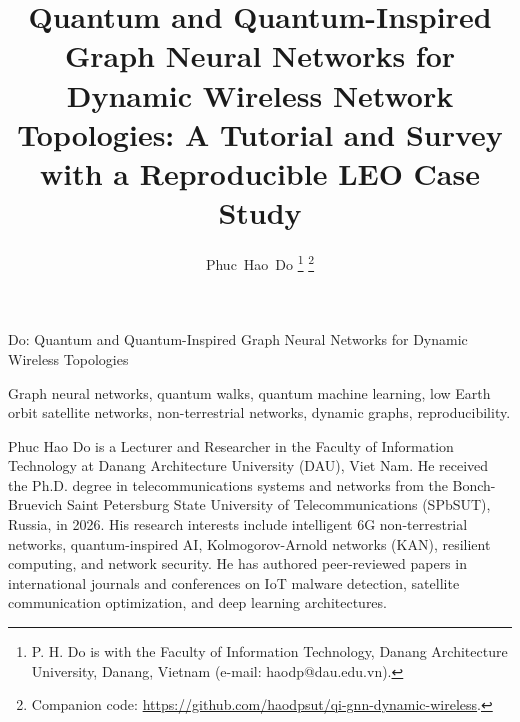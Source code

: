\documentclass[journal]{IEEEtran}
\begin{document}
\title{Quantum and Quantum-Inspired Graph Neural Networks for Dynamic Wireless
Network Topologies: A Tutorial and Survey with a Reproducible LEO Case Study}

\author{Phuc~Hao~Do%
\thanks{P. H. Do is with the Faculty of Information Technology, Danang
Architecture University, Danang, Vietnam (e-mail: haodp@dau.edu.vn).}%
\thanks{Companion code: \url{https://github.com/haodpsut/qi-gnn-dynamic-wireless}.}}

%
{Do: Quantum and Quantum-Inspired Graph Neural Networks for Dynamic Wireless Topologies}

\maketitle

\begin{abstract}

\end{abstract}

\begin{IEEEkeywords}
Graph neural networks, quantum walks, quantum machine learning, low Earth orbit
satellite networks, non-terrestrial networks, dynamic graphs, reproducibility.
\end{IEEEkeywords}


















\begin{IEEEbiographynophoto}{Phuc Hao Do}
is a Lecturer and Researcher in the Faculty of Information Technology at Danang
Architecture University (DAU), Viet Nam. He received the Ph.D. degree in
telecommunications systems and networks from the Bonch-Bruevich Saint Petersburg State
University of Telecommunications (SPbSUT), Russia, in 2026. His research interests
include intelligent 6G non-terrestrial networks, quantum-inspired AI, Kolmogorov-Arnold
networks (KAN), resilient computing, and network security. He has authored peer-reviewed
papers in international journals and conferences on IoT malware detection, satellite
communication optimization, and deep learning architectures.
\end{IEEEbiographynophoto}
\end{document}
